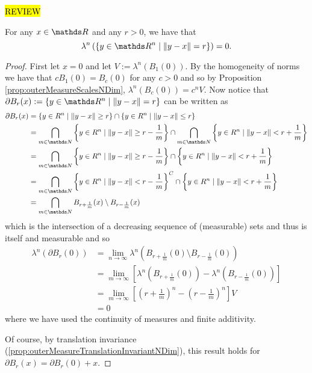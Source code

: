 \hl{REVIEW}
\begin{lem}
	\label{lem:ballBoundaryMeasureZero} For any $x \in \R$ and any $r > 0$, we have that 
	\[
		\lambda^n\left(\{y\in \R^n \mid \lVert y - x \rVert = r\}\right) = 0.
	\]
\end{lem}
\begin{proof}
	First let $x = 0$  and let $V := \lambda^n\left(B_1(0)\right)$. By the homogeneity of norms we have that $cB_1(0) = B_c(0)$ for any $c > 0$ and so by Proposition \ref{prop:outerMeasureScalesNDim}, $\lambda^n\left(B_c(0)\right) = c^nV$. Now notice that $\partial B_r(x) := \{y\in \R^n \mid \lVert y - x \rVert = r\}$ can be written as 
	\begin{align*}
		\partial B_r(x) &= \{y \in R^n \mid \lVert y - x \rVert \geq r \} \cap \{y \in R^n \mid \lVert y - x \rVert \leq r \} \\
		&= \bigcap_{m \in \N} \left\{y \in R^n \mid \lVert y - x \rVert \geq r - \frac{1}{m}  \right\} \cap \bigcap_{m \in \N}\left\{y \in R^n \mid \lVert y - x \rVert < r + \frac{1}{m} \right\} \\
		&=\bigcap_{m \in \N}  \left\{y \in R^n \mid \lVert y - x \rVert \geq r - \frac{1}{m}  \right\} \cap \left\{y \in R^n \mid \lVert y - x \rVert < r + \frac{1}{m} \right\} \\
		&= \bigcap_{m \in \N}  \left\{y \in R^n \mid \lVert y - x \rVert < r - \frac{1}{m}  \right\}^C \cap \left\{y \in R^n \mid \lVert y - x \rVert < r + \frac{1}{m} \right\} \\
		&= \bigcap_{m \in \N} B_{r+\frac{1}{m}}(x) \setminus B_{r-\frac{1}{m}}(x)
	\end{align*}
	which is the intersection of a decreasing sequence of (measurable) sets and thus is itself and measurable and so
	\begin{align*}
		\lambda^n\left(\partial B_r(0)\right) &= \lim_{n\to\infty} \lambda^n\left(B_{r+\frac{1}{m}}(0) \setminus B_{r-\frac{1}{m}}(0)\right) \\
		&= \lim_{m\to\infty}\left[ \lambda^n\left(B_{r+\frac{1}{m}}(0)\right) - \lambda^n\left(B_{r-\frac{1}{m}}(0)\right)\right] \\
		&= \lim_{m \to \infty} \left[ \left(r + \frac{1}{m}\right)^n -  \left(r - \frac{1}{m}\right)^n  \right] V \\
		&= 0
	\end{align*}
	where we have used the continuity of measures and finite additivity. 
	
	Of course, by translation invariance (\ref{prop:outerMeasureTranslationInvariantNDim}), this result holds for $\partial B_r(x) = \partial B_r(0) + x$.
	
\end{proof}

